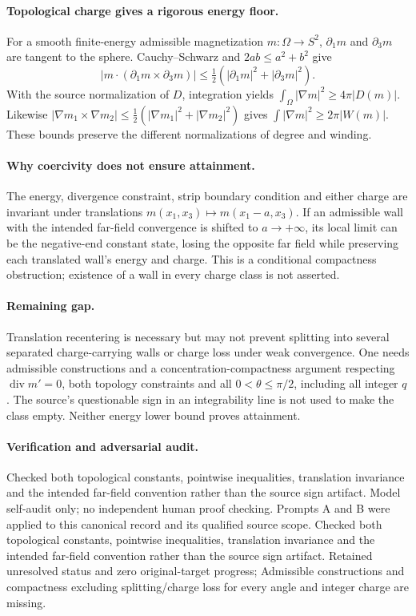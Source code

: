 \documentclass[11pt]{article}
\begin{document}
\paragraph{Topological charge gives a rigorous energy floor.} For a smooth finite-energy admissible magnetization $m:\Omega\to S^2$, $\partial_1m$ and $\partial_3m$ are tangent to the sphere. Cauchy--Schwarz and $2ab\leq a^2+b^2$ give
\[
 |m\cdot(\partial_1m\times\partial_3m)|
 \leq\tfrac12(|\partial_1m|^2+|\partial_3m|^2).
\]
With the source normalization of $D$, integration yields $\int_\Omega|\nabla m|^2\geq4\pi|D(m)|$. Likewise $|\nabla m_1\times\nabla m_2|\leq\tfrac12(|\nabla m_1|^2+|\nabla m_2|^2)$ gives $\int|\nabla m|^2\geq2\pi|W(m)|$. These bounds preserve the different normalizations of degree and winding.

\paragraph{Why coercivity does not ensure attainment.} The energy, divergence constraint, strip boundary condition and either charge are invariant under translations $m(x_1,x_3)\mapsto m(x_1-a,x_3)$. If an admissible wall with the intended far-field convergence is shifted to $a\to+\infty$, its local limit can be the negative-end constant state, losing the opposite far field while preserving each translated wall's energy and charge. This is a conditional compactness obstruction; existence of a wall in every charge class is not asserted.

\paragraph{Remaining gap.} Translation recentering is necessary but may not prevent splitting into several separated charge-carrying walls or charge loss under weak convergence. One needs admissible constructions and a concentration-compactness argument respecting $\operatorname{div}m'=0$, both topology constraints and all $0<\theta\leq\pi/2$, including all integer $q$. The source's questionable sign in an integrability line is not used to make the class empty. Neither energy lower bound proves attainment.

\paragraph{Verification and adversarial audit.}
Checked both topological constants, pointwise inequalities, translation invariance and the intended far-field convention rather than the source sign artifact. Model self-audit only; no independent human proof checking. Prompts A and B were applied to this canonical record and its qualified source scope. Checked both topological constants, pointwise inequalities, translation invariance and the intended far-field convention rather than the source sign artifact. Retained unresolved status and zero original-target progress; Admissible constructions and compactness excluding splitting/charge loss for every angle and integer charge are missing.
\end{document}
